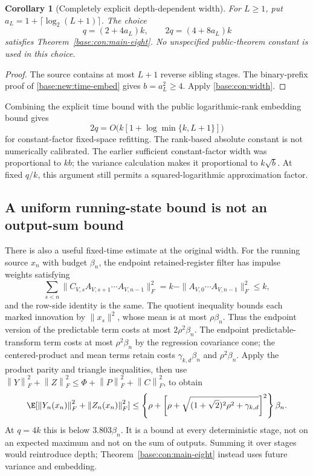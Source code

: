\documentclass[11pt,oneside,openany,a4paper]{book}
\numberwithin{equation}{chapter}
\newtheorem{corollary}[theorem]{Corollary}
\theoremstyle{definition}
\theoremstyle{remark}
\newcommand{\F}[1]{\left\lVert#1\right\rVert_F}
\begin{document}
\begin{corollary}[Completely explicit depth-dependent width]\label{base:con:explicit-width}
For $L\ge1$, put $a_L=1+\lceil\log_2(L+1)\rceil$. The choice
\[
 q=(2+4a_L)k,
 \qquad2q=(4+8a_L)k
\]
satisfies Theorem~\ref{base:con:main-eight}. No unspecified public-theorem constant is used in this choice.
\end{corollary}
\begin{proof}
The source contains at most $L+1$ reverse sibling stages. The binary-prefix proof of \eqref{base:new:time-embed} gives $b=a_L^2\ge4$. Apply \eqref{base:con:width}.
\end{proof}
Combining the explicit time bound with the public logarithmic-rank embedding bound gives
\[
 2q=O\bigl(k[1+\log\min\{k,L+1\}]\bigr)
\]
for constant-factor fixed-space refitting. The rank-based absolute constant is not numerically calibrated. The earlier sufficient constant-factor width was proportional to $kb$; the variance calculation makes it proportional to $k\sqrt b$. At fixed $q/k$, this argument still permits a squared-logarithmic approximation factor.

\subsection{A uniform running-state bound is not an output-sum bound}
There is also a useful fixed-time estimate at the original width. For the running source $x_n$ with budget $\beta_n$, the endpoint retained-register filter has impulse weights satisfying
\[
 \sum_{s<n}\|C_{V,s}A_{V,s+1}\cdots A_{V,n-1}\|_F^2
 =k-\|A_{V,0}\cdots A_{V,n-1}\|_F^2\le k,
\]
and the row-side identity is the same. The quotient inequality bounds each marked innovation by $\|x_s\|^2$, whose mean is at most $\rho\beta_n$. Thus the endpoint version of the predictable term costs at most $2\rho^2\beta_n$. The endpoint predictable-transform term costs at most $\rho^2\beta_n$ by the regression covariance cone; the centered-product and mean terms retain costs $\gamma_{k,d}\beta_n$ and $\rho^2\beta_n$. Apply the product parity and triangle inequalities, then use
$\F Y^2+\F Z^2\le\Phi+\F P^2+\F C^2$, to obtain
\begin{equation}\label{base:con:state-current}
 \E[\F{Y_n(x_n)}^2+\F{Z_n(x_n)}^2]
 \le\left\{\rho+
 \left[\rho+\sqrt{(1+\sqrt2)^2\rho^2+\gamma_{k,d}}\right]^2\right\}\beta_n.
\end{equation}
At $q=4k$ this is below $3.803\beta_n$. It is a bound at every deterministic stage, not on an expected maximum and not on the sum of outputs. Summing it over stages would reintroduce depth; Theorem~\ref{base:con:main-eight} instead uses future variance and embedding.
\end{document}

